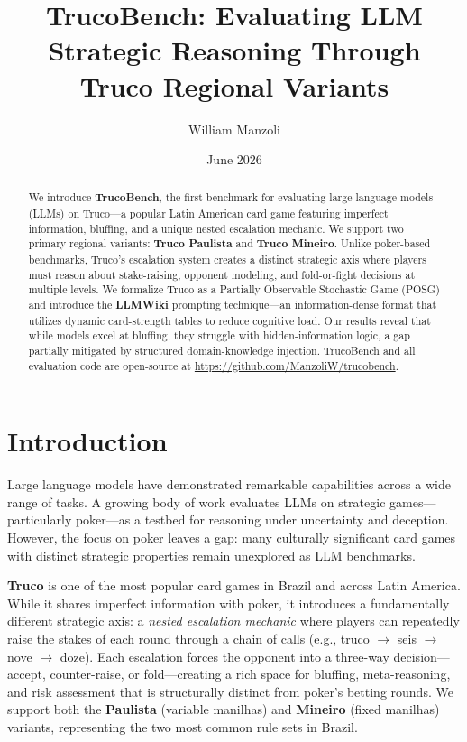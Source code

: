 \documentclass[11pt]{article}
\title{TrucoBench: Evaluating LLM Strategic Reasoning Through Truco Regional Variants}
\author{William Manzoli}
\date{June 2026}
\begin{document}
\maketitle

\begin{abstract}
We introduce \textbf{TrucoBench}, the first benchmark for evaluating large language models (LLMs) on Truco---a popular Latin American card game featuring imperfect information, bluffing, and a unique nested escalation mechanic. We support two primary regional variants: \textbf{Truco Paulista} and \textbf{Truco Mineiro}. Unlike poker-based benchmarks, Truco's escalation system creates a distinct strategic axis where players must reason about stake-raising, opponent modeling, and fold-or-fight decisions at multiple levels. We formalize Truco as a Partially Observable Stochastic Game (POSG) and introduce the \textbf{LLMWiki} prompting technique---an information-dense format that utilizes dynamic card-strength tables to reduce cognitive load. Our results reveal that while models excel at bluffing, they struggle with hidden-information logic, a gap partially mitigated by structured domain-knowledge injection. TrucoBench and all evaluation code are open-source at \url{https://github.com/ManzoliW/trucobench}.
\end{abstract}

\section{Introduction}

Large language models have demonstrated remarkable capabilities across a wide range of tasks. A growing body of work evaluates LLMs on strategic games---particularly poker---as a testbed for reasoning under uncertainty and deception. However, the focus on poker leaves a gap: many culturally significant card games with distinct strategic properties remain unexplored as LLM benchmarks.

\textbf{Truco} is one of the most popular card games in Brazil and across Latin America. While it shares imperfect information with poker, it introduces a fundamentally different strategic axis: a \emph{nested escalation mechanic} where players can repeatedly raise the stakes of each round through a chain of calls (e.g., truco $\to$ seis $\to$ nove $\to$ doze). Each escalation forces the opponent into a three-way decision---accept, counter-raise, or fold---creating a rich space for bluffing, meta-reasoning, and risk assessment that is structurally distinct from poker's betting rounds. We support both the \textbf{Paulista} (variable manilhas) and \textbf{Mineiro} (fixed manilhas) variants, representing the two most common rule sets in Brazil.
\end{document}
